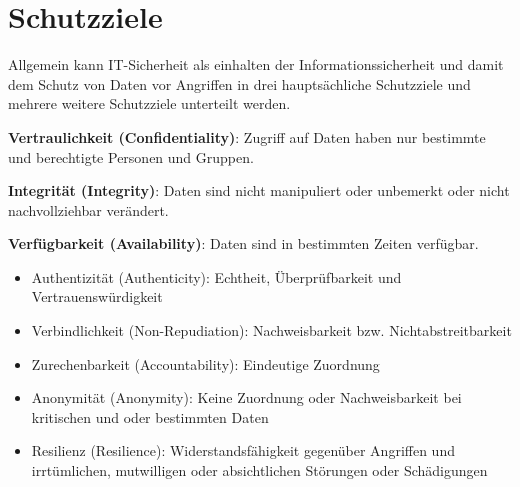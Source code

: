 \section{Schutzziele}

Allgemein kann IT-Sicherheit als einhalten der Informationssicherheit und damit dem Schutz von Daten vor Angriffen in drei hauptsächliche Schutzziele und mehrere weitere Schutzziele unterteilt werden.

\textbf{Vertraulichkeit (Confidentiality)}: Zugriff auf Daten haben nur bestimmte und berechtigte Personen und Gruppen.

\textbf{Integrität (Integrity)}: Daten sind nicht manipuliert oder unbemerkt oder nicht nachvollziehbar verändert.

\textbf{Verfügbarkeit (Availability)}: Daten sind in bestimmten Zeiten verfügbar.

\begin{itemize}
    \item Authentizität (Authenticity): Echtheit, Überprüfbarkeit und Vertrauenswürdigkeit
    \item Verbindlichkeit (Non-Repudiation): Nachweisbarkeit bzw. Nichtabstreitbarkeit
    \item Zurechenbarkeit (Accountability): Eindeutige Zuordnung
    \item Anonymität (Anonymity): Keine Zuordnung oder Nachweisbarkeit bei kritischen und oder bestimmten Daten
    \item Resilienz (Resilience): Widerstandsfähigkeit gegenüber Angriffen und irrtümlichen, mutwilligen oder absichtlichen Störungen oder Schädigungen
\end{itemize}